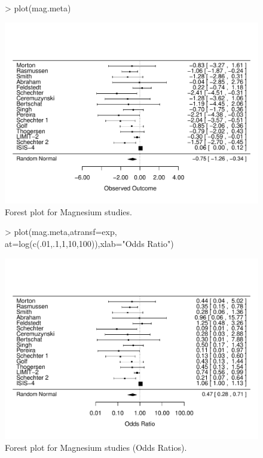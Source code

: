 \documentclass{article}
\begin{document}
\begin{figure}
  \centering
\begin{Schunk}
\begin{Sinput}
> plot(mag.meta)
\end{Sinput}
\end{Schunk}
\includegraphics{metaplus-examples-004}
  \caption{Forest plot for Magnesium studies.}
  \label{fig:forest1a}
\end{figure}


\begin{figure}
  \centering
\begin{Schunk}
\begin{Sinput}
> plot(mag.meta,atransf=exp, at=log(c(.01,.1,1,10,100)),xlab="Odds Ratio")
\end{Sinput}
\end{Schunk}
\includegraphics{metaplus-examples-005}
  \caption{Forest plot for Magnesium studies (Odds Ratios).}
  \label{fig:forest1b}
\end{figure}
\end{document}
